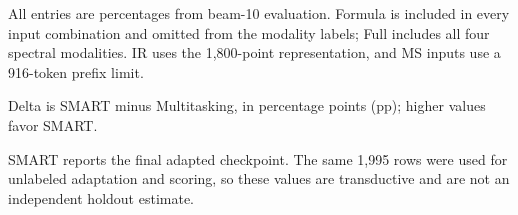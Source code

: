 \documentclass[10pt,border=6pt]{standalone}
\begin{document}
\begin{threeparttable}
\label{tab:chemotion-zero-shot-smart}
\begin{tablenotes}
\footnotesize
\item All entries are percentages from beam-10 evaluation. Formula is included in every input combination and omitted from the modality labels; Full includes all four spectral modalities. IR uses the 1,800-point representation, and MS inputs use a 916-token prefix limit.
\item Delta is SMART minus Multitasking, in percentage points (pp); higher values favor SMART.
\item SMART reports the final adapted checkpoint. The same 1,995 rows were used for unlabeled adaptation and scoring, so these values are transductive and are not an independent holdout estimate.
\end{tablenotes}
\end{threeparttable}
\end{document}
